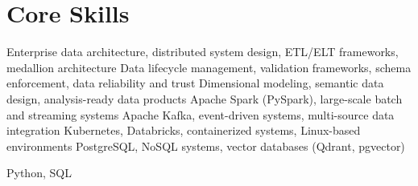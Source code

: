 \section*{Core Skills}
\vspace{-0.15em}

 {Enterprise data architecture, distributed system design, ETL/ELT frameworks, medallion architecture}
 {Data lifecycle management, validation frameworks, schema enforcement, data reliability and trust}
 {Dimensional modeling, semantic data design, analysis-ready data products}
 {Apache Spark (PySpark), large-scale batch and streaming systems}
 {Apache Kafka, event-driven systems, multi-source data integration}
 {Kubernetes, Databricks, containerized systems, Linux-based environments}
 {PostgreSQL, NoSQL systems, vector databases (Qdrant, pgvector)}

 Python, SQL \\